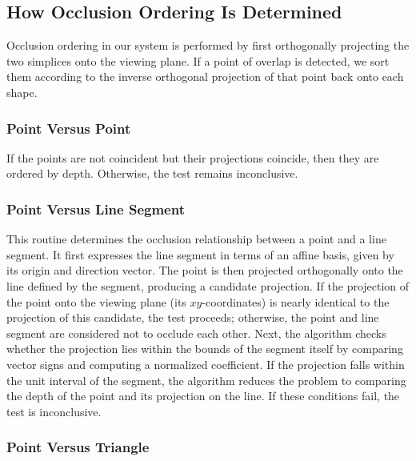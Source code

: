 \subsection{How Occlusion Ordering Is Determined}

Occlusion ordering in our system is performed by first orthogonally 
projecting the two simplices onto the viewing plane. If a point of 
overlap is detected, we sort them according to the inverse orthogonal 
projection of that point back onto each shape.

\subsubsection{Point Versus Point}

If the points are not coincident but their projections coincide, 
then they are ordered by depth. Otherwise, the test remains 
inconclusive.

\subsubsection{Point Versus Line Segment}

This routine determines the occlusion relationship between a point 
and a line segment. It first expresses the line segment in terms of 
an affine basis, given by its origin and direction vector. The point 
is then projected orthogonally onto the line defined by the segment, 
producing a candidate projection. If the projection of the point onto 
the viewing plane (its \(xy\)-coordinates) is nearly identical to the 
projection of this candidate, the test proceeds; otherwise, the point 
and line segment are considered not to occlude each other. Next, the 
algorithm checks whether the projection lies within the bounds of the 
segment itself by comparing vector signs and computing a normalized 
coefficient. If the projection falls within the unit interval of the 
segment, the algorithm reduces the problem to comparing the depth of 
the point and its projection on the line. If these conditions fail, 
the test is inconclusive.

\subsubsection{Point Versus Triangle}

